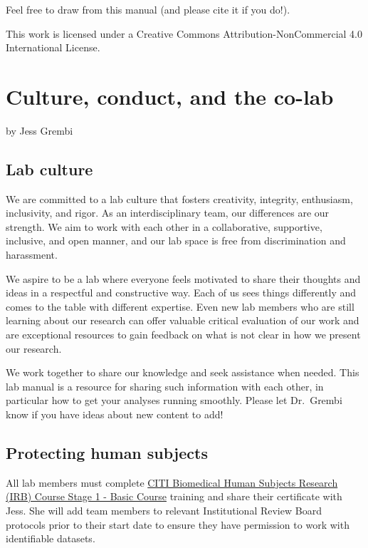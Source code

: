 \documentclass[
]{book}
\begin{document}
Feel free to draw from this manual (and please cite it if you do!).

This work is licensed under a Creative Commons Attribution-NonCommercial 4.0 International License.

\chapter{Culture, conduct, and the co-lab}\label{culture-conduct-and-the-co-lab}

by Jess Grembi

\section{Lab culture}\label{lab-culture}

We are committed to a lab culture that fosters creativity, integrity, enthusiasm, inclusivity, and rigor. As an interdisciplinary team, our differences are our strength. We aim to work with each other in a collaborative, supportive, inclusive, and open manner, and our lab space is free from discrimination and harassment.

We aspire to be a lab where everyone feels motivated to share their thoughts and ideas in a respectful and constructive way. Each of us sees things differently and comes to the table with different expertise. Even new lab members who are still learning about our research can offer valuable critical evaluation of our work and are exceptional resources to gain feedback on what is not clear in how we present our research.

We work together to share our knowledge and seek assistance when needed. This lab manual is a resource for sharing such information with each other, in particular how to get your analyses running smoothly. Please let Dr.~Grembi know if you have ideas about new content to add!

\section{Protecting human subjects}\label{protecting-human-subjects}

All lab members must complete \href{https://citi.psu.edu}{CITI Biomedical Human Subjects Research (IRB) Course Stage 1 - Basic Course} training and share their certificate with Jess. She will add team members to relevant Institutional Review Board protocols prior to their start date to ensure they have permission to work with identifiable datasets.
\end{document}
